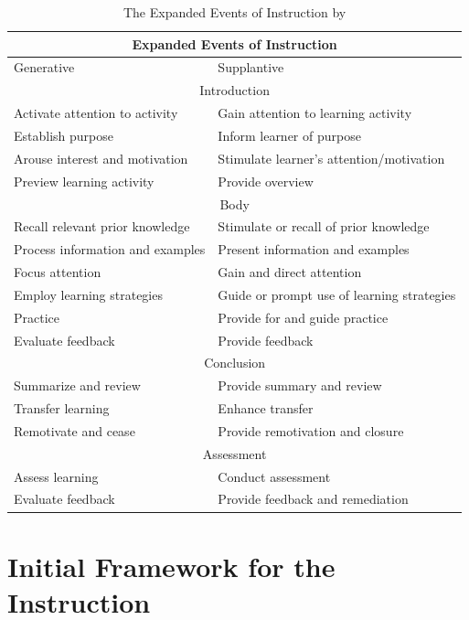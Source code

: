 \documentclass[11pt,twoside]{report} %
\begin{document}
\begin{table}[htbp]
\begin{center}
\begin{tabular}{|p{}|p{}|}
\hline
\multicolumn{ 2}{|c|}{\textbf{Expanded Events of Instruction}} \\ \hline
Generative & Supplantive \\ \hline
\multicolumn{ 2}{|c|}{Introduction} \\ \hline
Activate attention to activity & Gain attention to learning activity \\ \hline
Establish purpose & Inform learner of purpose \\ \hline
Arouse interest and motivation & Stimulate learner's attention/motivation \\ \hline
Preview learning activity & Provide overview \\ \hline
\multicolumn{ 2}{|c|}{Body} \\ \hline
Recall relevant prior knowledge & Stimulate or recall of prior knowledge \\ \hline
Process information and examples & Present information and examples \\ \hline
Focus attention & Gain and direct attention \\ \hline
Employ learning strategies & Guide or prompt use of learning strategies \\ \hline
Practice & Provide for and guide practice \\ \hline
Evaluate feedback & Provide feedback \\ \hline
\multicolumn{ 2}{|c|}{Conclusion} \\ \hline
Summarize and review & Provide summary and review \\ \hline
Transfer learning & Enhance transfer \\ \hline
Remotivate and cease & Provide remotivation and closure \\ \hline
\multicolumn{ 2}{|c|}{Assessment} \\ \hline
Assess learning & Conduct assessment \\ \hline
Evaluate feedback & Provide feedback and remediation \\ \hline
\end{tabular}
\end{center}
\caption{The Expanded Events of Instruction by \protect\cite{smithragan}}
\label{tab:eventsinstruction}
\end{table}

\chapter{Initial Framework for the Instruction}
\label{app:framework1}
\end{document}
